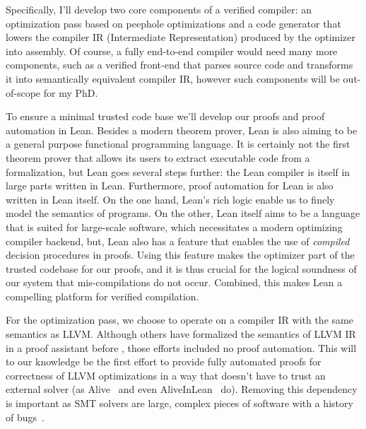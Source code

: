 \documentclass[a4paper]{scrartcl}
\begin{document}
Specifically, I'll develop two core components of a verified compiler:
an optimization pass based on peephole optimizations and a code
generator that lowers the compiler IR (Intermediate Representation)
produced by the optimizer into assembly. Of course, a fully end-to-end
compiler would need many more components, such as a verified front-end
that parses source code and transforms it into semantically equivalent
compiler IR, however such components will be out-of-scope for my PhD.

To ensure a minimal trusted code base we'll develop our proofs and proof
automation in Lean. Besides a modern theorem prover, Lean is also aiming
to be a general purpose functional programming language. It is certainly
not the first theorem prover that allows its users to extract executable
code from a formalization, but Lean goes several steps further: the Lean
compiler is itself in large parts written in Lean. Furthermore, proof
automation for Lean is also written in Lean itself. On the one hand,
Lean's rich logic enable us to finely model the semantics of programs.
On the other, Lean itself aims to be a language that is suited for
large-scale software, which necessitates a modern optimizing compiler
backend, but, Lean also has a feature that enables the use of
\emph{compiled} decision procedures in proofs. Using this feature makes
the optimizer part of the trusted codebase for our proofs, and it is
thus crucial for the logical soundness of our system that
mis-compilations do not occur. Combined, this makes Lean a compelling
platform for verified compilation.

For the optimization pass, we choose to operate on a compiler IR with the same semantics as LLVM.
Although others have formalized the semantics of LLVM IR in a proof assistant before
\cite{zhaoFormalVerificationSSABased, zakowskiModularCompositionalExecutable2021}, those efforts
included no proof automation. This will to our knowledge be the first
effort to provide fully automated proofs for correctness of LLVM
optimizations in a way that doesn't have to trust an external solver (as
Alive~\cite{lopesAlive2BoundedTranslation2021} and even AliveInLean~\cite{leeAliveInLeanVerifiedLLVM2019} do). Removing
this dependency is important as SMT solvers are large, complex pieces of
software with a history of bugs~\cite{brummayerFuzzingDeltadebuggingSMT2009, mansurDetectingCriticalBugs2020}.

\end{document}
